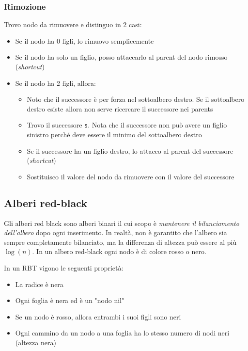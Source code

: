 \subsubsection{Rimozione}\label{bst rimozione}
Trovo nodo da rimuovere e distinguo in 2 casi:
\begin{itemize}
	\item Se il nodo ha 0 figli, lo rimuovo semplicemente
	\item Se il nodo ha solo un figlio, posso attaccarlo al parent del nodo rimosso (\textit{shortcut})
	\item Se il nodo ha 2 figli, allora:
	      \begin{itemize}
		      \item Noto che il successore è per forza nel sottoalbero destro. Se il sottoalbero destro esiste allora non serve ricercare il successore nei parents
		      \item Trovo il successore \verb|s|. Nota che il successore non può avere un figlio sinistro perché deve essere il minimo del sottoalbero destro
		      \item Se il successore ha un figlio destro, lo attacco al parent del successore (\textit{shortcut})
		      \item Sostituisco il valore del nodo da rimuovere con il valore del successore
	      \end{itemize}
\end{itemize}



\subsection{Alberi red-black}
Gli alberi red black sono alberi binari il cui scopo è \textit{mantenere il bilanciamento dell'albero} dopo ogni inserimento. In realtà, non è garantito che l'albero sia sempre completamente bilanciato, ma la differenza di altezza può essere al più $ \log \left(n\right) $. In un albero red-black ogni nodo è di colore rosso o nero.

\vskip3mm
In un RBT vigono le seguenti proprietà:
\begin{itemize}
	\item La radice è nera
	\item Ogni foglia è nera ed è un "nodo nil"
	\item Se un nodo è rosso, allora entrambi i suoi figli sono neri
	\item Ogni cammino da un nodo a una foglia ha lo stesso numero di nodi neri (altezza nera)
\end{itemize}
